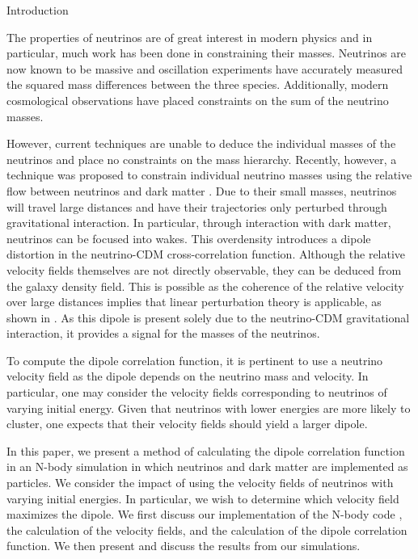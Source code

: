 \begin{section}{Introduction}
  \label{sec:introduction}

The properties of neutrinos are of great interest in modern 
physics and in particular, much work has been done in constraining 
their masses. Neutrinos are now known to be massive and oscillation 
experiments have accurately measured the squared mass differences 
between the three species. Additionally, modern cosmological 
observations have placed constraints on the sum of the neutrino 
masses.

\par However, current techniques are unable to deduce the 
individual masses of the neutrinos and place no constraints 
on the mass hierarchy. Recently, however, a technique was 
proposed to constrain individual neutrino masses using the 
relative flow between neutrinos and dark matter \cite{bib:Zhu2013, 
bib:Zhu2014}. Due to their small masses, neutrinos will 
travel large distances and have their trajectories only
 perturbed through gravitational interaction. In particular, 
through interaction with dark matter, neutrinos can be focused 
into wakes. This overdensity introduces a dipole distortion 
in the neutrino-CDM cross-correlation function. Although the 
relative velocity fields themselves are not directly observable, 
they can be deduced from the galaxy density field. This is possible as the 
coherence of the relative velocity over large distances implies 
that linear perturbation theory is applicable, as shown in 
\cite{bib:Inman}. As this dipole is present solely due to the neutrino-CDM 
gravitational interaction, it provides a signal for the masses 
of the neutrinos.

\par To compute the dipole correlation function, it is pertinent 
to use a neutrino velocity field as the dipole depends on the 
neutrino mass and velocity. In particular, one may consider the 
velocity fields corresponding to neutrinos of varying initial 
energy. Given that neutrinos with lower energies are more likely 
to cluster, one expects that their velocity fields should yield 
a larger dipole.  

\par In this paper, we present a method of calculating the 
dipole correlation function in an N-body simulation in which
neutrinos and dark matter are implemented as particles. We consider 
the impact of using the velocity fields of neutrinos with 
varying initial energies. In particular, we wish to determine which
velocity field maximizes the dipole. We first discuss our implementation of 
the N-body code \cpm \cite{bib:HarnoisDeraps2013}, the calculation 
of the velocity fields, and the calculation of the dipole correlation 
function. We then present and discuss the results from our simulations.

\end{section}

